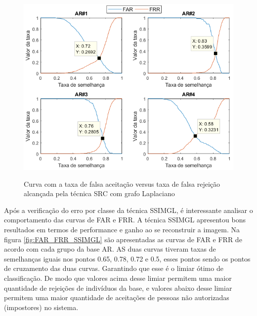 \begin{figure}[H]
\centering
\caption{Curva com a taxa de falsa aceitação versus taxa de falsa rejeição alcançada pela técnica SRC  com grafo Laplaciano}
\includegraphics[scale=0.60]{imgs4/graficos_FAR_FRR/SRC_Laplace}
\label{fig:FAR_FRR_SRC_GL}
\end{figure}






Após a verificação do erro por classe da técnica SSIMGL, é interessante analisar o comportamento das curvas de FAR e FRR. A técnica SSIMGL apresentou bons resultados em termos de performance e ganho ao se reconstruir a imagem. Na figura \ref{fig:FAR_FRR_SSIMGL} são apresentadas as curvas de FAR e FRR de acordo com cada grupo da base AR. AS duas curvas tiveram taxas de semelhanças iguais nos pontos 0.65, 0.78, 0.72 e 0.5, esses pontos sendo os pontos de cruzamento das duas curvas. Garantindo que esse é o limiar ótimo de classificação. De modo que valores acima desse limiar permitem uma maior quantidade de rejeições de indivíduos da base, e valores abaixo desse limiar permitem uma maior quantidade de aceitações de pessoas não autorizadas (impostores) no sistema. 


